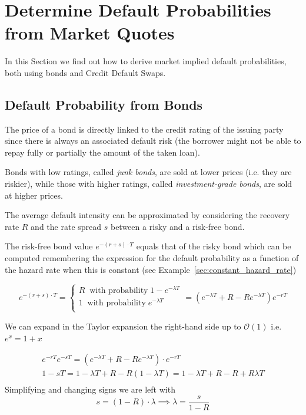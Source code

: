 \section{Determine Default Probabilities from Market Quotes}
In this Section we find out how to derive market implied default probabilities, both using bonds and Credit Default Swaps.

\subsection{Default Probability from Bonds}
\label{default-probabilities-and-bond-prices}

The price of a bond is directly linked to the credit rating of the issuing party since there is always an associated default risk (the borrower might not be able to repay fully or partially the amount of the taken loan). 

Bonds with low ratings, called \textit{junk bonds}, are sold at lower prices (i.e. they are riskier), while those with higher ratings, called \textit{investment-grade bonds}, are sold at higher prices.

The average default intensity can be approximated by considering the recovery rate $R$ and the rate spread $s$ between a risky and a risk-free bond.

The risk-free bond value $e^{-(r+s)\cdot T}$ equals that of the risky bond which can be computed remembering the expression for the default probability as a function of the hazard rate when this is constant (see Example~\ref{sec:constant_hazard_rate})

\begin{equation}
e^{-(r+s)\cdot T} = 
\begin{cases}
R\;\;\textrm{with probability}\;1 - e^{-\lambda T} \\
1\;\;\textrm{with probability}\;e^{-\lambda T} \\
\end{cases} = 
(e^{-\lambda T} + R - R e^{-\lambda T})e^{-rT}
\end{equation}

We can expand in the Taylor expansion the right-hand side up to $\mathcal{O}(1)$ i.e. $e^{x} = 1 + x$

\begin{equation}
\begin{gathered}
e^{-rT}e^{-sT} = (e^{-\lambda T} + R - R e^{-\lambda T})\cdot e^{-rT}\\
1 - sT = 1 - \lambda T + R - R(1 - \lambda T) = 1 - \lambda T + R - R + R\lambda T\\
\end{gathered}
\end{equation}
Simplifying and changing signs we are left with
\begin{equation}
s = (1 - R)\cdot \lambda \implies \lambda = \frac{s}{1-R}
\end{equation}


